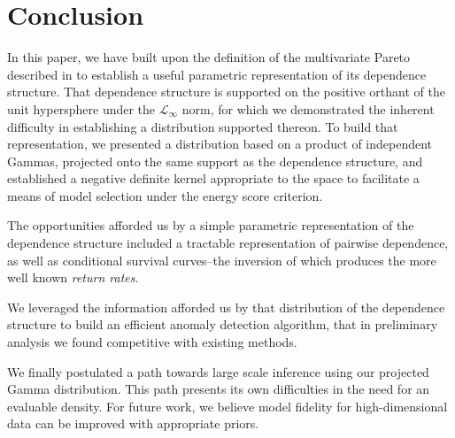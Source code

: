 
\section{Conclusion}
In this paper, we have built upon the definition of the multivariate Pareto described in \cite{ferreira2014}
  to establish a useful parametric representation of its dependence structure.  That dependence structure
  is supported on the positive orthant of the unit hypersphere under the $\mathcal{L}_{\infty}$ norm,
  for which we demonstrated the inherent difficulty in establishing a distribution supported thereon.
  To build that representation, we presented a distribution based on a product of independent Gammas,
  projected onto the same support as the dependence structure, and established a negative definite kernel
  appropriate to the space to facilitate a means of model selection under the energy score criterion.

The opportunities afforded us by a simple parametric representation of the dependence structure included
  a tractable representation of pairwise dependence, as well as conditional survival curves--the
  inversion of which produces the more well known \emph{return rates}.

We leveraged the information afforded us by that distribution of the dependence structure to build
  an efficient anomaly detection algorithm, that in preliminary analysis we found competitive with
  existing methods.

We finally postulated a path towards large scale inference using our projected Gamma distribution.
  This path presents its own difficulties in the need for an evaluable density.  For future work, we
  believe model fidelity for high-dimensional data can be improved with appropriate priors.
  





